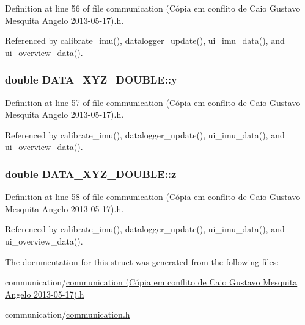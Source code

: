 Definition at line 56 of file communication (\-Cópia em conflito de Caio Gustavo Mesquita Angelo 2013-\/05-\/17).\-h.



Referenced by calibrate\-\_\-imu(), datalogger\-\_\-update(), ui\-\_\-imu\-\_\-data(), and ui\-\_\-overview\-\_\-data().

\hypertarget{structDATA__XYZ__DOUBLE_a198a27b5df3b5b0bf461b0e481e22a82}{
\subsubsection[{y}]{\setlength{\rightskip}{0pt plus 5cm}double D\-A\-T\-A\-\_\-\-X\-Y\-Z\-\_\-\-D\-O\-U\-B\-L\-E\-::y}}\label{structDATA__XYZ__DOUBLE_a198a27b5df3b5b0bf461b0e481e22a82}


Definition at line 57 of file communication (\-Cópia em conflito de Caio Gustavo Mesquita Angelo 2013-\/05-\/17).\-h.



Referenced by calibrate\-\_\-imu(), datalogger\-\_\-update(), ui\-\_\-imu\-\_\-data(), and ui\-\_\-overview\-\_\-data().

\hypertarget{structDATA__XYZ__DOUBLE_a9556e8868c223ff3e28756ea18a284c0}{
\subsubsection[{z}]{\setlength{\rightskip}{0pt plus 5cm}double D\-A\-T\-A\-\_\-\-X\-Y\-Z\-\_\-\-D\-O\-U\-B\-L\-E\-::z}}\label{structDATA__XYZ__DOUBLE_a9556e8868c223ff3e28756ea18a284c0}


Definition at line 58 of file communication (\-Cópia em conflito de Caio Gustavo Mesquita Angelo 2013-\/05-\/17).\-h.



Referenced by calibrate\-\_\-imu(), datalogger\-\_\-update(), ui\-\_\-imu\-\_\-data(), and ui\-\_\-overview\-\_\-data().



The documentation for this struct was generated from the following files\-:\begin{DoxyCompactItemize}
\item 
communication/\hyperlink{communication_01_07C_xC3_xB3pia_01em_01conflito_01de_01Caio_01Gustavo_01Mesquita_01Angelo_012013-05-17_08_8h}{communication (\-Cópia em conflito de Caio Gustavo Mesquita Angelo 2013-\/05-\/17).\-h}\item 
communication/\hyperlink{communication_2communication_8h}{communication.\-h}\end{DoxyCompactItemize}
